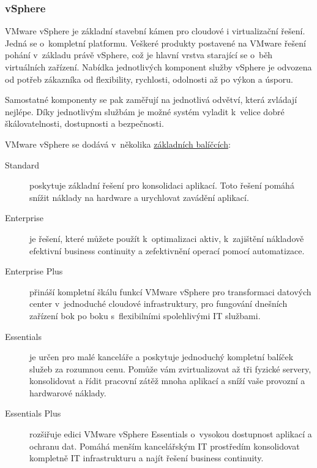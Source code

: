 \subsubsection{vSphere}
\label{sec:vSphere}
VMware vSphere je základní stavební kámen pro cloudové i virtualizační řešení. Jedná se o~kompletní platformu. Veškeré produkty postavené na VMware řešení pohání v~základu právě vSphere, což je hlavní vrstva starající se o~běh virtuálních zařízení. Nabídka jednotlivých komponent služby vSphere je odvozena od potřeb zákazníka od flexibility, rychlosti, odolnosti až po výkon a úsporu.\cite{vmware:vSphere}

Samostatné komponenty se pak zaměřují na jednotlivá odvětví, která zvládají nejlépe. Díky jednotlivým službám je možné systém vyladit k~velice dobré škálovatelnosti, dostupnosti a bezpečnosti.

VMware vSphere se dodává v~několika \href{http://www.vmware.com/products/vsphere/compare.html}{základních balíčcích}:
\begin{description}
	\item[Standard] poskytuje základní řešení pro konsolidaci aplikací. Toto řešení pomáhá snížit náklady na hardware a urychlovat zavádění aplikací.\cite{vmware:vSphereOldanyGroup}
	\item[Enterprise] je řešení, které můžete použít k~optimalizaci aktiv, k~zajištění nákladově efektivní business continuity a zefektivnění operací pomocí automatizace.\cite{vmware:vSphereOldanyGroup}
	\item[Enterprise Plus] přináší kompletní škálu funkcí VMware vSphere pro transformaci datových center v~jednoduché cloudové infrastruktury, pro fungování dnešních zařízení bok po boku s~flexibilními spolehlivými IT službami.\cite{vmware:vSphereOldanyGroup}
	\item[Essentials] je určen pro malé kanceláře a poskytuje jednoduchý kompletní balíček služeb za rozumnou cenu. Pomůže vám zvirtualizovat až tři fyzické servery, konsolidovat a řídit pracovní zátěž mnoha aplikací a sníží vaše provozní a hardwarové náklady.\cite{vmware:vSphereOldanyGroup}
	\item[Essentials Plus] rozšiřuje edici VMware vSphere Essentials o~vysokou dostupnost aplikací a ochranu dat. Pomáhá menším kancelářským IT prostředím konsolidovat kompletně IT infrastrukturu a najít řešení business continuity.\cite{vmware:vSphereOldanyGroup}
\end{description}

